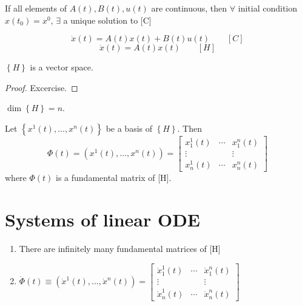 \documentclass[twoside]{article}
\newcommand\lcb{\left \{}
\newcommand\rcb{\right \}}
\begin{document}
\begin{theorem}
    If all elements of $A(t), B(t), u(t)$ are continuous, then $\forall$ initial condition $x(t_{0}) = x^{0}$, $\exists$ a unique solution to [C]
\end{theorem}

\begin{remark}  
    \begin{equation}
        \dot{x}(t) = A(t)x(t)+ B(t)u(t) \qquad [C]
    \end{equation}
    \begin{equation}
        \dot{x}(t) = A(t)x(t)  \qquad [H]
    \end{equation}
\end{remark}

\begin{theorem}
    $\lcb H \rcb$ is a vector space.
\end{theorem}
\begin{proof}
    Excercise.
\end{proof}

\begin{theorem}
    $\dim \lcb H \rcb = n$.
\end{theorem}

\begin{definition}
    Let $\lcb x^1(t), ..., x^n(t) \rcb$ be a basis of $\lcb H \rcb$. Then \begin{equation}
        \Phi(t) = (x^1(t), ..., x^n(t)) = \begin{bmatrix}
            x_{1}^{1}(t)& \cdots & x_{1}^{n}(t)    \\[0.3em]
       \vdots   &        & \vdots       \\[0.3em]
       x_{n}^{1}(t)& \cdots & x_{n}^{n}(t)  
        \end{bmatrix}
    \end{equation}
    where $\Phi(t)$ is a fundamental matrix of [H].
\end{definition}

\section{Systems of linear ODE}
\begin{remark}
    \begin{enumerate}
        \item There are infinitely many fundamental matrices of [H]
        \item $\dot{\Phi}(t) \equiv (\dot{x}^1(t), ..., \dot{x}^n(t)) 
        = \begin{bmatrix}
            \dot{x}_{1}^{1}(t)& \cdots & \dot{x}_{1}^{n}(t)    \\[0.3em]
            \vdots   &        & \vdots       \\[0.3em]
            \dot{x}_{n}^{1}(t)& \cdots & \dot{x}_{n}^{n}(t)  
        \end{bmatrix}$
    \end{enumerate}
\end{remark}
\end{document}
